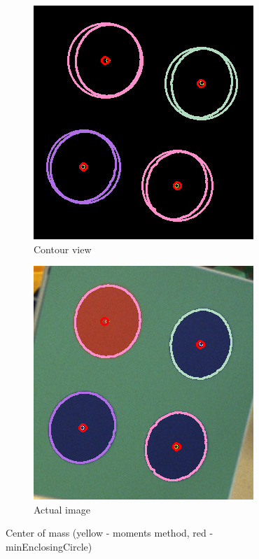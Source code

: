 \begin{figure}[ht!]
	\begin{subfigure}{.49\textwidth}
		\centering
		\includegraphics[width=\textwidth]{figures/Marker1centers}
	\caption{Contour view}
	\label{fig:markerColorcenter1}
	\end{subfigure}
	\begin{subfigure}{0.49\textwidth}
		\centering
		\includegraphics[width=\textwidth]{figures/Marker1centers2}
	\caption{Actual image}
	\label{fig:markerColorcenter2}
	\end{subfigure}
\caption{Center of mass (yellow - moments method, red - minEnclosingCircle)}
\label{fig:markerColorcenter}
\end{figure}

